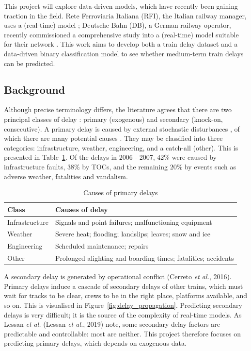 \documentclass[12pt,a4paper]{article}
\begin{document}
This project will explore data-driven models, which have recently been gaining traction in the field. Rete Ferroviaria Italiana (RFI), the Italian railway manager, uses a (real-time) model \cite{oneto_et_al_2016}; Deutsche Bahn (DB), a German railway operator, recently commissioned a comprehensive study into a (real-time) model suitable for their network \cite{lessan_fu_wen_2019}. This work aims to develop both a train delay dataset and a data-driven binary classification model to see whether medium-term train delays can be predicted.

\subsection{Background}

Although precise terminology differs, the literature agrees that there are two principal classes of delay \cite{olsson_haugland_2004}: primary (exogenous) and secondary (knock-on, consecutive). A primary delay is caused by external stochastic disturbances \cite{oneto_et_al_2016}, of which there are many potential causes \cite{berger_et_al_2011,milinkovic_et_al_2013}. They may be classified into three categories: infrastructure, weather, engineering, and a catch-all (other). This is presented in Table~\ref{table:primary_delay}. Of the delays in 2006 - 2007, $42$\% were caused by infrastructure faults, $38$\% by TOCs, and the remaining $20$\% by events such as adverse weather, fatalities and vandalism. 

\begin{table}[]
\centering
\caption{Causes of primary delays}
\label{table:primary_delay}
\begin{tabular}{|l|l|}
\hline
\textbf{Class} & \textbf{Causes of delay}                                      \\ \hline
Infrastructure & Signals and point failures; malfunctioning equipment          \\ \hline
Weather        & Severe heat; flooding; landslips; leaves; snow and ice        \\ \hline
Engineering    & Scheduled maintenance; repairs                                \\ \hline
Other          & Prolonged alighting and boarding times; fatalities; accidents \\ \hline
\end{tabular}
\end{table}

A secondary delay is generated by operational conflict (Cerreto \textit{et al.}, 2016). Primary delays induce a cascade of secondary delays of other trains, which must wait for tracks to be clear, crews to be in the right place, platforms available, and so on. This is visualised in Figure~\ref{fig:delay_propagation}. Predicting secondary delays is very difficult; it is the source of the complexity of real-time models. As Lessan \textit{et al.} (Lessan \textit{et al.}, 2019) note, some secondary delay factors are predictable and controllable: most are neither. This project therefore focuses on predicting primary delays, which depends on exogenous data. 
\end{document}
